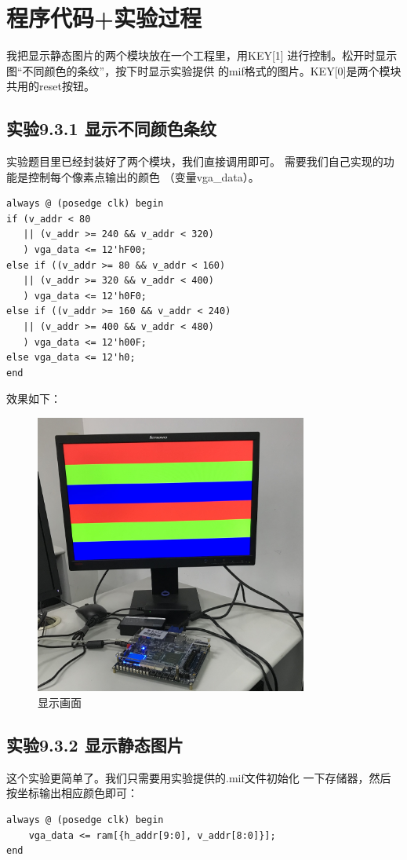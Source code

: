 \documentclass[12pt,a4paper,UTF8]{article}
\begin{document}
\section{程序代码+实验过程}

我把显示静态图片的两个模块放在一个工程里，用\mbox{KEY[1]}
进行控制。松开时显示图``不同颜色的条纹''，按下时显示实验提供
的mif格式的图片。\mbox{KEY[0]}是两个模块共用的reset按钮。

\subsection{实验9.3.1 显示不同颜色条纹}
实验题目里已经封装好了两个模块，我们直接调用即可。
需要我们自己实现的功能是控制每个像素点输出的颜色
（变量\mbox{vga\_data}）。
\begin{lstlisting}[style=verilog-style]
always @ (posedge clk) begin
if (v_addr < 80 
   || (v_addr >= 240 && v_addr < 320)
   ) vga_data <= 12'hF00;
else if ((v_addr >= 80 && v_addr < 160)
   || (v_addr >= 320 && v_addr < 400)
   ) vga_data <= 12'h0F0;
else if ((v_addr >= 160 && v_addr < 240)
   || (v_addr >= 400 && v_addr < 480)
   ) vga_data <= 12'h00F;
else vga_data <= 12'h0;
end 
\end{lstlisting}

效果如下：
\begin{figure}[H]
  \centering
  \includegraphics[width=0.8\textwidth]{img1.JPG}
  \caption{显示画面}
  \label{img1}
\end{figure}


\subsection{实验9.3.2 显示静态图片}
这个实验更简单了。我们只需要用实验提供的.mif文件初始化
一下存储器，然后按坐标输出相应颜色即可：
\begin{lstlisting}[style=verilog-style]
always @ (posedge clk) begin
    vga_data <= ram[{h_addr[9:0], v_addr[8:0]}];
end
\end{lstlisting}
\end{document}
